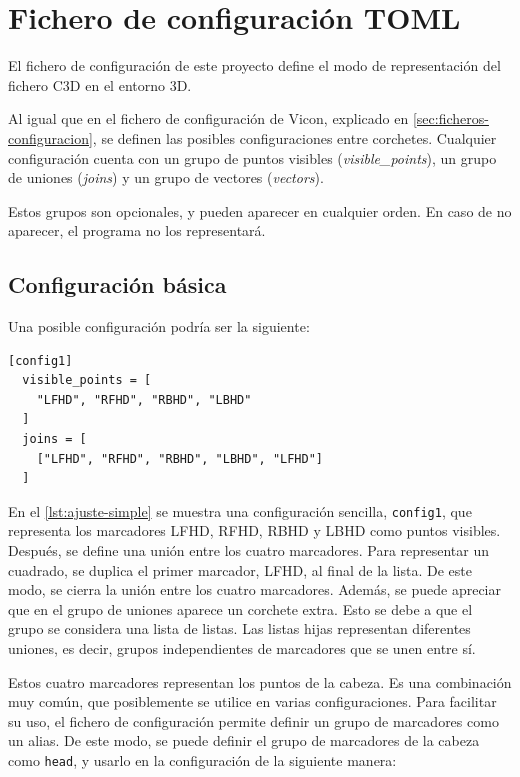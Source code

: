 \section{Fichero de configuración \acs{TOML}}

El fichero de configuración de este proyecto define el modo de representación del fichero \ac{C3D} en el entorno 3D. 

Al igual que en el fichero de configuración de Vicon, explicado en \autoref{sec:ficheros-configuracion}, se definen las posibles configuraciones entre corchetes. Cualquier configuración cuenta con un grupo de puntos visibles (\textit{visible\_points}), un grupo de uniones (\textit{joins}) y un grupo de vectores (\textit{vectors}).

Estos grupos son opcionales, y pueden aparecer en cualquier orden. En caso de no aparecer, el programa no los representará.

\subsection{Configuración básica}

Una posible configuración podría ser la siguiente:

\begin{lstlisting}[style=mystyle, caption={Ejemplo simple de un fichero de configuración}, label={lst:ajuste-simple}]
[config1]
  visible_points = [
    "LFHD", "RFHD", "RBHD", "LBHD"
  ]
  joins = [
    ["LFHD", "RFHD", "RBHD", "LBHD", "LFHD"]
  ]
\end{lstlisting}

En el \autoref{lst:ajuste-simple} se muestra una configuración sencilla, \texttt{config1}, que representa los marcadores \ac{LFHD}, \ac{RFHD}, \ac{RBHD} y \ac{LBHD} como puntos visibles. Después, se define una unión entre los cuatro marcadores. Para representar un cuadrado, se duplica el primer marcador, \ac{LFHD}, al final de la lista. De este modo, se cierra la unión entre los cuatro marcadores. Además, se puede apreciar que en el grupo de uniones aparece un corchete extra. Esto se debe a que el grupo se considera una lista de listas. Las listas hijas representan diferentes uniones, es decir, grupos independientes de marcadores que se unen entre sí.

Estos cuatro marcadores representan los puntos de la cabeza. Es una combinación muy común, que posiblemente se utilice en varias configuraciones. Para facilitar su uso, el fichero de configuración permite definir un grupo de marcadores como un alias. De este modo, se puede definir el grupo de marcadores de la cabeza como \texttt{head}, y usarlo en la configuración de la siguiente manera:

